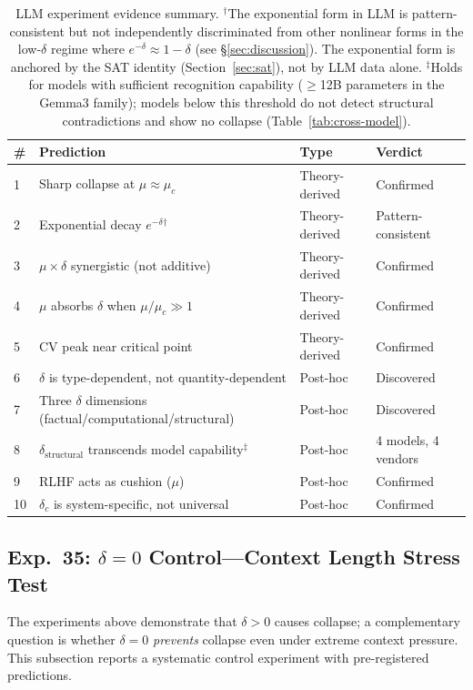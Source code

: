 \documentclass[11pt,a4paper]{article}
\begin{document}
\begin{table}[htbp]
\centering
\small
\begin{tabular}{llll}
\toprule
\textbf{\#} & \textbf{Prediction} & \textbf{Type} & \textbf{Verdict} \\
\midrule
1 & Sharp collapse at $\mu \approx \mu_c$ & Theory-derived & Confirmed \\
2 & Exponential decay $e^{-\delta}$$^\dagger$ & Theory-derived & Pattern-consistent \\
3 & $\mu \times \delta$ synergistic (not additive) & Theory-derived & Confirmed \\
4 & $\mu$ absorbs $\delta$ when $\mu/\mu_c \gg 1$ & Theory-derived & Confirmed \\
5 & CV peak near critical point & Theory-derived & Confirmed \\
\midrule
6 & $\delta$ is type-dependent, not quantity-dependent & Post-hoc & Discovered \\
7 & Three $\delta$ dimensions (factual/computational/structural) & Post-hoc & Discovered \\
8 & $\delta_{\text{structural}}$ transcends model capability$^\ddagger$ & Post-hoc & 4 models, 4 vendors \\
9 & RLHF acts as cushion ($\mu$) & Post-hoc & Confirmed \\
10 & $\delta_c$ is system-specific, not universal & Post-hoc & Confirmed \\
\bottomrule
\end{tabular}
\caption{LLM experiment evidence summary. $^\dagger$The exponential form in LLM is pattern-consistent but not independently discriminated from other nonlinear forms in the low-$\delta$ regime where $e^{-\delta} \approx 1 - \delta$ (see \S\ref{sec:discussion}). The exponential form is anchored by the SAT identity (Section~\ref{sec:sat}), not by LLM data alone. $^\ddagger$Holds for models with sufficient recognition capability ($\geq$12B parameters in the Gemma3 family); models below this threshold do not detect structural contradictions and show no collapse (Table~\ref{tab:cross-model}).}
\label{tab:llm-summary}
\end{table}

\subsection{Exp.~35: $\delta = 0$ Control---Context Length Stress Test}
\label{sec:exp35}

The experiments above demonstrate that $\delta > 0$ causes collapse; a complementary question is whether $\delta = 0$ \emph{prevents} collapse even under extreme context pressure. This subsection reports a systematic control experiment with pre-registered predictions.
\end{document}
